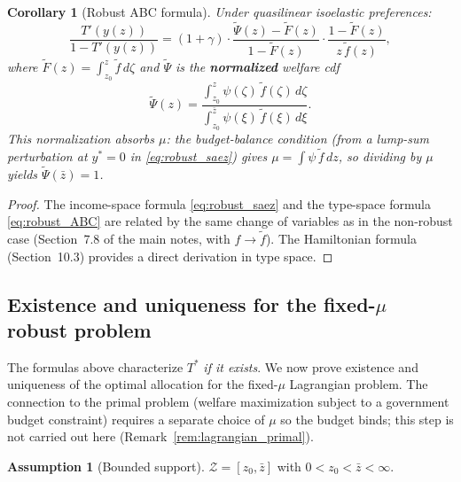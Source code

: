 \documentclass[12pt,a4paper]{article}
\theoremstyle{definition}
\newtheorem{assumption}{Assumption}[section]
\theoremstyle{plain}
\newtheorem{corollary}{Corollary}[section]
\theoremstyle{remark}
\newcommand{\zbar}{\bar{z}}
\newcommand{\zlow}{z_{\scriptscriptstyle 0}}
\newcommand{\calZ}{\mathcal{Z}}
\begin{document}
\begin{corollary}[Robust ABC formula]
\label{prop:robust_ABC}
Under quasilinear isoelastic preferences:
\begin{equation}
\label{eq:robust_ABC}
  \frac{T'(y(z))}{1 - T'(y(z))}
  = (1+\gamma) \cdot
  \frac{\widetilde\Psi(z) - \widetilde F(z)}{
    1 - \widetilde F(z)} \cdot
  \frac{1 - \widetilde F(z)}{z\,\widetilde f(z)},
\end{equation}
where $\widetilde F(z) = \int_{\zlow}^z \widetilde f\,d\zeta$
and $\widetilde\Psi$ is the \textbf{normalized} welfare cdf
\begin{equation}
\label{eq:Psi_normalized}
  \widetilde\Psi(z)
  = \frac{\int_{\zlow}^z \psi(\zeta)\,
    \widetilde f(\zeta)\,d\zeta}
  {\int_{\zlow}^{\zbar} \psi(\xi)\,
    \widetilde f(\xi)\,d\xi}.
\end{equation}
This normalization absorbs $\mu$: the budget-balance
condition (from a lump-sum perturbation at $y^* = 0$
in \eqref{eq:robust_saez}) gives
$\mu = \int \psi\,\widetilde f\,dz$, so dividing
by $\mu$ yields $\widetilde\Psi(\zbar) = 1$.
\end{corollary}

\begin{proof}
The income-space formula \eqref{eq:robust_saez} and the
type-space formula \eqref{eq:robust_ABC} are related by
the same change of variables as in the non-robust case
(Section~7.8 of the main notes, with $f \to \widetilde f$).
The Hamiltonian formula (Section~10.3) provides a direct
derivation in type space.
\end{proof}


\subsection{Existence and uniqueness for the
fixed-$\mu$ robust problem}
\label{sec:existence}

The formulas above characterize $T^*$ \emph{if it exists}.
We now prove existence and uniqueness of the optimal
allocation for the fixed-$\mu$ Lagrangian problem.  The
connection to the primal problem (welfare maximization
subject to a government budget constraint) requires a
separate choice of $\mu$ so the budget binds; this step
is not carried out here
(Remark~\ref{rem:lagrangian_primal}).

\begin{assumption}[Bounded support]
\label{as:bounded}
$\calZ = [\zlow, \zbar]$ with $0 < \zlow < \zbar < \infty$.
\end{assumption}
\end{document}
